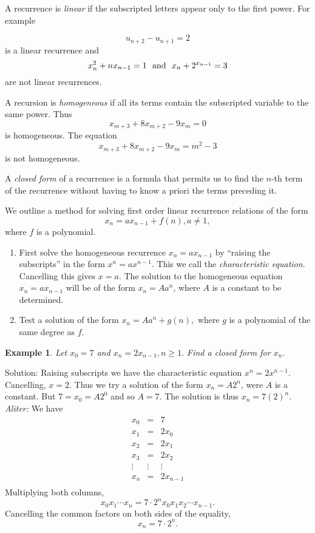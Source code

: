 \documentclass[11pt, openany]{book}
\theoremstyle{change} \theoremheaderfont{\blue\sffamily\bfseries}
\newtheorem{exa}[thm]{Example}
\theoremstyle{nonumberplain} \theoremheaderfont{\sffamily\bfseries}
\newcommand{\í}{\'{\i}}
\begin{document}
A recurrence is {\em linear} if the subscripted letters appear
only to the first power. For example

$$u_{n + 2} - u_{n + 1} = 2$$ is a linear recurrence and
$$x ^2 _n + nx_{n - 1} = 1 \ \ {\rm and } \ \ x_n + 2^{x_{n - 1}} = 3 $$are not linear
recurrences.



A recursion is {\em homogeneous} if all its terms contain the
subscripted variable to the same power. Thus
$$x_{m + 3} + 8x_{m + 2} - 9x_m = 0$$ is homogeneous. The equation
$$x_{m + 3} + 8x_{m + 2} - 9x_m = m^2 - 3$$is not homogeneous.



A {\em closed form} of a recurrence is a formula that permits us
to find the $n$-th term of the recurrence without having to know a
priori the terms preceding it.



We outline a method for solving first order linear recurrence
relations of the form
$$x_n = ax_{n - 1} + f(n), a \neq 1,$$ where $f$ is a polynomial. \\
\begin{enumerate}
\item First solve the homogeneous recurrence $x_n = ax_{n - 1}$ by
``raising the subscripts'' in the form $x^n = ax^{n - 1}$. This we
call the {\em characteristic equation}. Cancelling this gives $x =
a.$ The solution to the homogeneous equation $x_n = ax_{n - 1}$
will be of the form $x_n = Aa^n$, where $A$ is a constant to be
determined. \item Test a solution of the form $x_n = Aa^n + g(n),$
where $g$ is a polynomial of the same degree as $f$.
\end{enumerate}




\begin{exa} Let $x_0 = 7$ and $x_n = 2x_{n - 1}, n \geq 1.$ Find a closed form for $x_n.$\end{exa}
Solution: Raising subscripts we have the characteristic equation
$x^n = 2x^{n - 1}$. Cancelling, $x = 2$. Thus we try a solution of
the form $x_n = A2^n$, were $A$ is a constant. But $7 = x_0 =
A2^0$ and so $A = 7.$
The solution is thus $x_n = 7(2)^n$. \\
{\em Aliter:} We have
$$
\begin{array}{lcl}
x_0 & = & 7 \\
x_1 & = & 2x_0 \\
x_2 & = & 2x_1 \\
x_3 & = & 2x_2 \\
\vdots & \vdots & \vdots \\
x_n & = & 2x_{n-1} \\
\end{array}
$$
Multiplying both columns,
$$x_0x_1\cdots x_n = 7\cdot 2^nx_0x_1x_2\cdots x_{n - 1}.$$Cancelling the common factors on both sides of
the equality,
$$x_n = 7\cdot 2^n.$$
\end{document}
